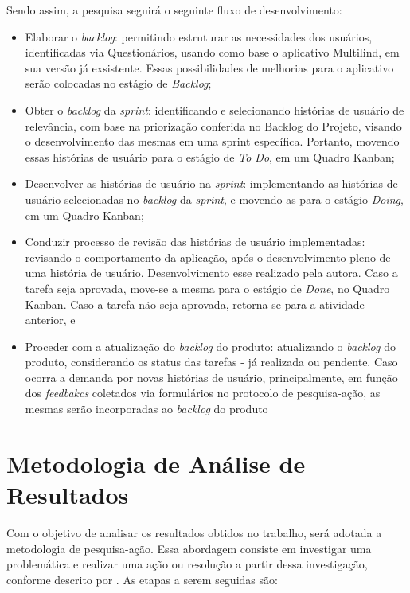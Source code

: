 Sendo assim, a pesquisa seguirá o seguinte fluxo de desenvolvimento:

\begin{itemize}
	\item Elaborar o \textit{backlog}: permitindo estruturar as necessidades dos usuários, identificadas via Questionários, usando como base o aplicativo Multilind, em sua versão já exsistente. Essas possibilidades de melhorias para o aplicativo serão colocadas no estágio de \textit{Backlog};
	\item Obter o \textit{backlog} da \textit{sprint}:  identificando e selecionando histórias de usuário de relevância, com base na priorização conferida no Backlog do Projeto, visando o desenvolvimento das mesmas em uma sprint específica. Portanto, movendo essas histórias de usuário para o estágio de
	\textit{To Do}, em um Quadro Kanban;
	\item Desenvolver as histórias de usuário na \textit{sprint}: implementando as histórias de usuário selecionadas no \textit{backlog} da \textit{sprint}, e movendo-as para o estágio \textit{Doing}, em um Quadro Kanban;
	\item Conduzir processo de revisão das histórias de usuário implementadas: revisando o comportamento da aplicação, após o desenvolvimento pleno de uma história de usuário. Desenvolvimento esse realizado pela autora. Caso a tarefa seja
	aprovada, move-se a mesma para o estágio de \textit{Done}, no Quadro Kanban. Caso a tarefa não seja aprovada, retorna-se para a atividade anterior, e
	\item Proceder com a atualização do \textit{backlog} do produto: atualizando o \textit{backlog} do produto, considerando os status das tarefas - já realizada ou pendente. Caso ocorra a demanda por novas histórias de usuário, principalmente, em função dos \textit{feedbakcs} coletados via formulários no protocolo de pesquisa-ação, as mesmas serão incorporadas ao \textit{backlog} do produto
\end{itemize}

\section{Metodologia de Análise de Resultados}
\label{sec:Metodologia de Analise de Resultados}
Com o objetivo de analisar os resultados obtidos no trabalho, será adotada a metodologia de pesquisa-ação. Essa abordagem consiste em investigar uma problemática e realizar uma ação ou resolução a partir dessa investigação, conforme descrito por . As etapas a 
serem seguidas são:

